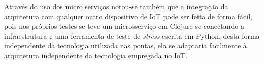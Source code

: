 Através do uso dos micro serviços notou-se também que a integração da arquitetura com qualquer outro dispositivo de IoT pode ser feita de forma fácil, pois nos próprios testes se teve um microsserviço em Clojure se conectando a infraestrutura e uma ferramenta de teste de \textit{stress} escrita em Python, desta forma independente da tecnologia utilizada nas pontas, ela se adaptaria facilmente à arquitetura independente da tecnologia empregada no IoT. 